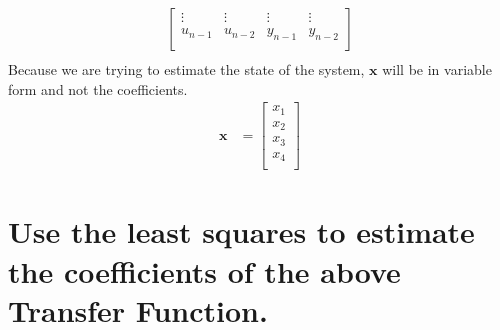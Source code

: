 \documentclass[12pt,letterpaper, onecolumn]{exam}
\begin{document}
\begin{questions}
\begin{parts}
{\begin{equation}
\begin{split}
\begin{bmatrix}
                        \vdots  & \vdots  & \vdots  & \vdots  \\
                        u_{n-1} & u_{n-2} & y_{n-1} & y_{n-2} \\
                    \end{bmatrix}\\
                \end{split}
                \label{eq:15}
            \end{equation}
            Because we are trying to estimate the state of the system, $\mathbf{x}$ will be in variable form and not the coefficients.
            \begin{equation}
                \begin{split}
                    \mathbf{x} & =
                    \begin{bmatrix}
                        x_1 \\
                        x_2 \\
                        x_3 \\
                        x_4 \\
                    \end{bmatrix}
                \end{split}
                \label{eq:16}
            \end{equation}
        }

        \part{Use the least squares to estimate the coefficients of the above Transfer Function.}
        \begin{subparts}


\end{subparts}
\end{parts}
\end{questions}
\end{document}
